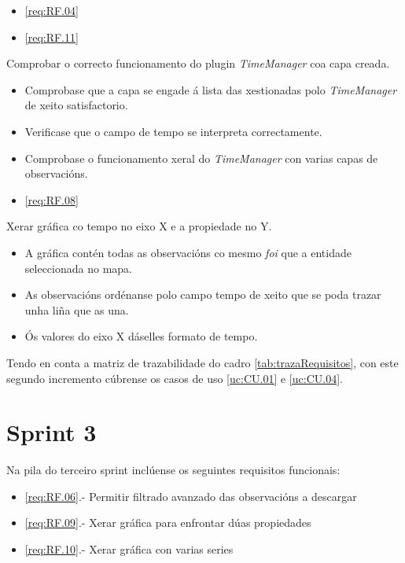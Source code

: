 		  {\begin{itemize}\item \ref{req:RF.04} \item \ref{req:RF.11} \end{itemize}} %
		  {Comprobar o correcto funcionamento do plugin \emph{TimeManager} coa capa creada.} %
		  {\begin{itemize}
		  \item Comprobase que a capa se engade á lista das xestionadas polo \emph{TimeManager} de xeito satisfactorio.
		  \item Verificase que o campo de tempo se interpreta correctamente.
		  \item Comprobase o funcionamento xeral do \emph{TimeManager} con varias capas de observacións.
		  \end{itemize}} %
		  
		  {\begin{itemize}\item \ref{req:RF.08} \\\end{itemize}} %
		  {Xerar gráfica co tempo no eixo X e a propiedade no Y.} %
		  {\begin{itemize}
		  \item A gráfica contén todas as observacións co mesmo \emph{foi} que a entidade seleccionada no mapa.
		  \item As observacións ordénanse polo campo tempo de xeito que se poda trazar unha liña que as una.
		  \item Ós valores do eixo X dáselles formato de tempo.
		  \end{itemize}} %
		  
Tendo en conta a matriz de trazabilidade do cadro \ref{tab:trazaRequisitos}, con este segundo incremento cúbrense os casos de uso \ref{uc:CU.01} e \ref{uc:CU.04}.
		  
\section{Sprint 3}
Na pila do terceiro sprint inclúense os seguintes requisitos funcionais:
\begin{itemize}
\item \ref{req:RF.06}.- Permitir filtrado avanzado das observacións a descargar
\item \ref{req:RF.09}.- Xerar gráfica para enfrontar dúas propiedades
\item \ref{req:RF.10}.- Xerar gráfica con varias series
\end{itemize}


